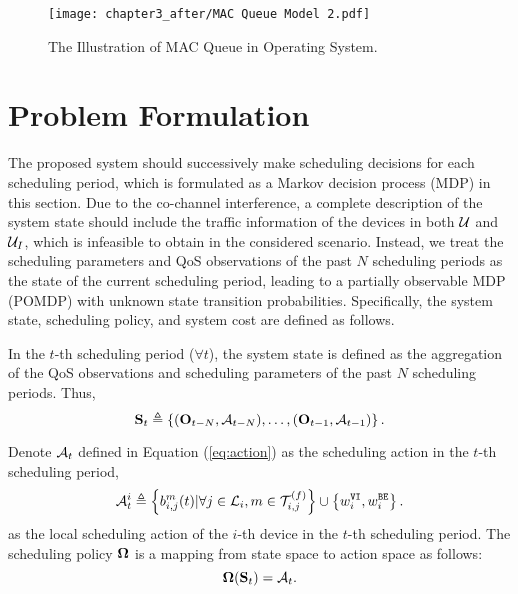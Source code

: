 \begin{figure}[!t]
    \centering
    \texttt{[image: chapter3\_after/MAC Queue Model 2.pdf]}
    \caption{The Illustration of MAC Queue in Operating System.}
    \label{fig:MAC}
\end{figure}

\section{Problem Formulation}
\label{sec:Problem Formulation}
The proposed {\algName} system should successively make scheduling decisions for each scheduling period, which is formulated as a Markov decision process (MDP) in this section. Due to the co-channel interference, a complete description of the system state should include the traffic information of the devices in both $\mathcal{U}$ and $\mathcal{U}_I$, which is infeasible to obtain in the considered scenario. Instead, we treat the scheduling parameters and QoS observations of the past $N$ scheduling periods as the state of the current scheduling period, leading to a partially observable MDP (POMDP) with unknown state transition probabilities. Specifically, the system state, scheduling policy, and system cost are defined as follows.

\begin{definition} In the $t$-th scheduling period ($\forall t$), the system state is defined as the aggregation of the QoS observations and scheduling parameters of the past $N$ scheduling periods. Thus,
    \begin{equation}
        \mathbf{S}_t \triangleq \left\{
        (\mathbf{O}_{t-N},\mathcal{A}_{t-N}),\ldots,(\mathbf{O}_{t-1},\mathcal{A}_{t-1})
        \right\}.
    \end{equation}
\end{definition}

\begin{definition} Denote $\mathcal{A}_t$ defined in Equation (\ref{eq:action}) as the scheduling action in the $t$-th scheduling period,
\begin{equation}
    \mathcal{A}_t^i \triangleq 
    \left\{ 
        b_{i,j}^m(t) | \forall j \in \mathcal{L}_i, {m} \in{\mathcal{T}_{i,j}^{(f)}} 
    \right\} 
    \cup 
    \left\{ 
        w_{i}^{\mathtt{VI}}, w_{i}^{\mathtt{BE}} 
    \right\}.
\end{equation}
as the local scheduling action of the $i$-th device in the $t$-th scheduling period. The scheduling policy {$\boldsymbol{\Omega}$} is a mapping from {state space} to {action space} as follows:
    \begin{equation}
        \boldsymbol{\Omega}( \mathbf{S}_t ) = \mathcal{A}_t.
    \end{equation}
\end{definition}

